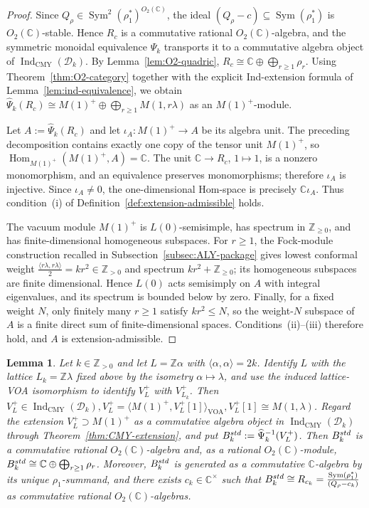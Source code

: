 \documentclass[10pt,a4paper]{amsart}
\numberwithin{equation}{section} \newtheorem{thm}{Theorem}[section] \newtheorem{lem}[thm]{Lemma} \newtheorem{ex}[thm]{Example} \newtheorem{prop}[thm]{Proposition} \newtheorem{cor}[thm]{Corollary} \newtheorem{defi}[thm]{Definition} \newtheorem{rmk}[thm]{Remark} \newtheorem{notation}[thm]{Notation}
\newcommand{\Sym}{\operatorname{Sym}}
\newcommand{\Hom}{\operatorname{Hom}}
\newcommand{\Dk}{\mathcal D_k}
\newcommand{\IndCMY}{\operatorname{Ind}_{\mathrm{CMY}}}
\newcommand{\Otwo}{O_2(\C)}
\def\Z{\mathbb{Z}} \def\N{\mathbb{N}} \def\A{\mathbb{A}} \def\C{\mathbb{C}} \def\R{\mathbb{R}} \def\Q{\mathbb{Q}} \def\F{\mathbb{F}}
\begin{document}
\begin{proof}
Since $Q_\rho\in\Sym^2(\rho_1^*)^{\Otwo}$, the ideal $(Q_\rho-c)\subseteq\Sym(\rho_1^*)$ is $\Otwo$-stable. Hence $R_c$ is a commutative rational $\Otwo$-algebra, and the symmetric monoidal equivalence $\widehat\Psi_k$ transports it to a commutative algebra object of $\IndCMY(\Dk)$. By Lemma~\ref{lem:O2-quadric}, \(R_c\cong\C\oplus\bigoplus_{r\ge1}\rho_r\). Using Theorem~\ref{thm:O2-category} together with the explicit Ind-extension formula of Lemma~\ref{lem:ind-equivalence}, we obtain \(\widehat\Psi_k(R_c)\cong M(1)^+\oplus\bigoplus_{r\ge1}M(1,r\lambda)\) as an $M(1)^+$-module.

Let $A:=\widehat\Psi_k(R_c)$ and let $\iota_A:M(1)^+\to A$ be its algebra unit. The preceding decomposition contains exactly one copy of the tensor unit $M(1)^+$, so \(\Hom_{M(1)^+}(M(1)^+,A)=\C.\) The unit $\C\to R_c$, $1\mapsto1$, is a nonzero monomorphism, and an equivalence preserves monomorphisms; therefore $\iota_A$ is injective. Since $\iota_A\ne0$, the one-dimensional Hom-space is precisely \(\C\iota_A\). Thus condition~\textnormal{(i)} of Definition~\ref{def:extension-admissible} holds.

The vacuum module $M(1)^+$ is $L(0)$-semisimple, has spectrum in $\Z_{\ge0}$, and has finite-dimensional homogeneous subspaces. For $r\ge1$, the Fock-module construction recalled in Subsection~\ref{subsec:ALY-package} gives lowest conformal weight \(\frac{\langle r\lambda,r\lambda\rangle}{2}=kr^2\in\Z_{>0}\) and spectrum $kr^2+\Z_{\ge0}$; its homogeneous subspaces are finite dimensional. Hence $L(0)$ acts semisimply on $A$ with integral eigenvalues, and its spectrum is bounded below by zero. Finally, for a fixed weight $N$, only finitely many $r\ge1$ satisfy $kr^2\le N$, so the weight-$N$ subspace of $A$ is a finite direct sum of finite-dimensional spaces. Conditions~\textnormal{(ii)}--\textnormal{(iii)} therefore hold, and $A$ is extension-admissible.
\end{proof}

\begin{lem}
\label{lem:standard-O2-all-k}
Let $k\in\Z_{>0}$ and let $L=\Z\alpha$ with $\langle\alpha,\alpha\rangle=2k$. Identify $L$ with the lattice $L_k=\Z\lambda$ fixed above by the isometry $\alpha\mapsto\lambda$, and use the induced lattice-VOA isomorphism to identify $V_L^+$ with $V_{L_k}^+$. Then \(V_L^+\in\IndCMY(\Dk),V_L^+=\langle M(1)^+,V_L^+[1]\rangle_{\mathrm{VOA}}, V_L^+[1]\cong M(1,\lambda)\). Regard the extension $V_L^+\supset M(1)^+$ as a commutative algebra object in $\IndCMY(\Dk)$ through Theorem~\ref{thm:CMY-extension}, and put \(B_k^{\rm std}:=\widehat\Psi_k^{-1}(V_L^+)\). Then $B_k^{\rm std}$ is a commutative rational $\Otwo$-algebra and, as a rational $\Otwo$-module, \(B_k^{\rm std}\cong\C\oplus\bigoplus_{r\ge1}\rho_r\). Moreover, $B_k^{\rm std}$ is generated as a commutative $\C$-algebra by its unique $\rho_1$-summand, and there exists $c_k\in\C^\times$ such that \(B_k^{\rm std}\cong R_{c_k}=\frac{\Sym(\rho_1^*)}{(Q_\rho-c_k)}\) as commutative rational $\Otwo$-algebras.
\end{lem}
\end{document}
